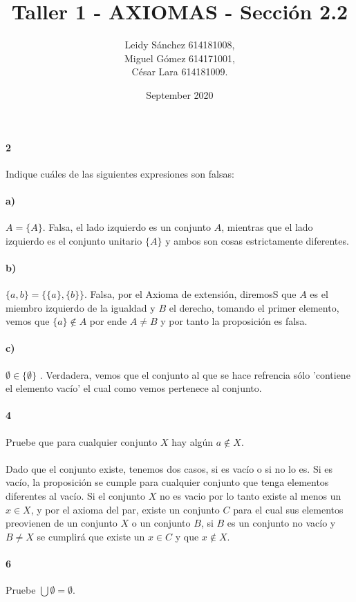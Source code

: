 \documentclass{article}
\title{Taller 1 - AXIOMAS - Sección 2.2}
\author{Leidy Sánchez 614181008, \\ Miguel Gómez 614171001,\\ César Lara 614181009.}
\date{September 2020}
\begin{document}
	\maketitle
	\paragraph{2} Indique cuáles de las siguientes expresiones son falsas:
	\paragraph{a)} $A = \{ A \}$. Falsa, el lado izquierdo es un conjunto $A$, mientras que el lado izquierdo es el conjunto unitario $\{A\}$ y ambos son cosas estrictamente diferentes.
	\paragraph{b)} $\{ a, b \} = \{ \{a\}, \{b\} \}$. Falsa, por el Axioma de extensión, diremosS que $A$ es el miembro izquierdo de la igualdad y $B$ el derecho, tomando el primer elemento, vemos que $\{a\} \notin A$ por ende $A \neq B$ y por tanto la proposición es falsa.
	\paragraph{c)} $\emptyset \in \{\emptyset\}$ . Verdadera, vemos que el conjunto al que se hace refrencia sólo 'contiene el elemento vacío' el cual como vemos pertenece al conjunto.
	\paragraph{4} Pruebe que para cualquier conjunto $X$ hay algún $a \notin X$.
	\paragraph{} Dado que el conjunto existe, tenemos dos casos, si es vacío o si no lo es. Si es vacío, la proposición se cumple para cualquier conjunto que tenga elementos diferentes al vacío. Si el conjunto $X$ no es vacio por lo tanto existe al menos un $x \in X$, y por el axioma del par, existe un conjunto $C$ para el cual sus elementos preovienen de un conjunto $X$ o un conjunto $B$, si $B$ es un conjunto no vacío y $B \neq X$ se cumplirá que existe un $x \in C$ y que $x \notin X$.
	\paragraph{6} Pruebe $\bigcup\emptyset = \emptyset$.
\end{document}
